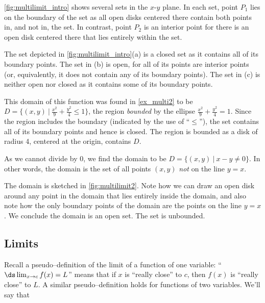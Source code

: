 \autoref{fig:multilimit_intro} shows several sets in the $x$-$y$ plane. In each set, point $P_1$ lies on the boundary of the set as all open disks centered there contain both points in, and not in, the set. In contrast, point $P_2$ is an interior point for there is an open disk centered there that lies entirely within the set.

The set depicted in \autoref{fig:multilimit_intro}(a) is a closed set as it contains all of its boundary points. The set in (b) is open, for all of its points are interior points (or, equivalently, it does not contain any of its boundary points). The set in (c) is neither open nor closed as it contains  some of its boundary points.

{This domain of this function was found in \autoref{ex_multi2} to be $D = \{(x,y)\ |\ \frac{x^2}9+\frac{y^2}4\leq 1\}$, the region \textit{bounded} by the ellipse $\frac{x^2}9+\frac{y^2}4=1$. Since the region includes the boundary (indicated by the use of ``$\leq$''), the set contains all of its boundary points and hence is closed. The region is bounded as a disk of radius 4, centered at the origin, contains $D$.}

{As we cannot divide by 0, we find the domain to be $D = \{(x,y)\ |\ x-y\neq 0\}$. In other words, the domain is the set of all points $(x,y)$ \emph{not} on the line $y=x$. 

The domain is sketched in \autoref{fig:multilimit2}. Note how we can draw an open disk around any point in the domain that lies entirely inside the domain, and also note how the only boundary points of the domain are the points on the line $y=x$. We conclude the domain is an open set. The set is unbounded.}

\subsection*{Limits}

Recall a pseudo--definition of the limit of a function of one variable: ``$\ds \lim_{x\to c}f(x) = L$'' means that if $x$ is ``really close'' to $c$, then $f(x)$ is ``really close'' to $L$. A similar pseudo--definition holds for functions of two variables. We'll say that 

